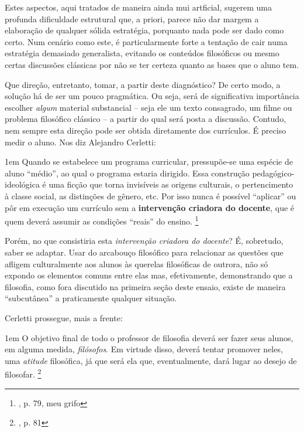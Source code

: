 \documentclass[12pt,a4paper]{article}
\newenvironment{citac}{
	\begin{addmargin}[4cm]{1em} \footnotesize}{\normalfont \end{addmargin}
}
\begin{document}
	Estes aspectos, aqui tratados de maneira ainda mui artficial, 
	sugerem uma profunda dificuldade estrutural que, a priori, parece 
	não dar margem a elaboração de qualquer sólida estratégia, porquanto 
	nada pode ser dado como certo. Num cenário como este, é 
	particularmente forte a tentação de cair numa estratégia demasiado 
	generalista, evitando os conteúdos filosóficos ou mesmo certas 
	discussões clássicas por não se ter certeza quanto as bases que 
	o aluno tem. 

	Que direção, entretanto, tomar, a partir deste diagnóstico? De certo 
	modo, a solução há de ser um pouco pragmática. Ou seja, será de 
	significativa importância escolher \emph{algum} material substancial
	-- seja ele um texto consagrado, um filme ou problema filosófico 
	clássico -- a partir do qual será posta a discussão. Contudo, nem 
	sempre esta direção pode ser obtida diretamente dos currículos. É 
	preciso medir o aluno. Nos diz Alejandro Cerletti: 

	\begin{citac}
		Quando se estabelece um programa curricular, pressupõe-se 
		uma espécie de aluno “médio”, ao qual o programa estaria 
		dirigido. Essa construção pedagógico-ideológica é uma 
		ficção que torna invisíveis as origens culturais, o 
		pertencimento à classe social, as distinções de gênero, 
		etc. Por isso nunca é possível “aplicar” ou pôr em 
		execução um currículo sem a \textbf{intervenção 
		criadora do docente}, que é quem deverá assumir as 
		condições “reais” do ensino. 
		\footnote{\cite{cerletti}, p. 79, meu grifo}
	\end{citac}

	Porém, no que consistiria esta \emph{intervenção criadora do docente}? 
	É, sobretudo, saber se adaptar. Usar do arcabouço filosófico para 
	relacionar as questões que afligem culturalmente aos alunos às 
	querelas filosóficas de outrora, não só expondo os elementos comuns 
	entre elas mas, efetivamente, demonstrando que a filosofia, como 
	fora discutido na primeira seção deste ensaio, existe de maneira 
	“subcutânea” a praticamente qualquer situação. 

	Cerletti prossegue, mais a frente: 

	\begin{citac}
		O objetivo final de todo o professor de filosofia deverá ser
		fazer seus alunos, em alguma medida, \textit{filósofos}. Em 
		virtude disso, deverá tentar promover neles, uma \textit{
		atitude} filosófica, já que será ela que, eventualmente, dará 
		lugar ao desejo de filosofar. 
		\footnote{\cite{cerletti}, p. 81}
	\end{citac}
\end{document}
